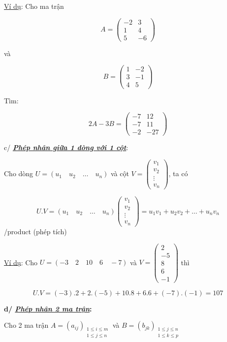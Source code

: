 \documentclass[12pt,a4paper]{article} \usepackage[utf8]{inputenc} \usepackage[T5]{fontenc} \usepackage[vietnamese]{babel} \usepackage{amsmath, amssymb, amsfonts} \usepackage{ulem}
\begin{document}
\ul{Ví dụ}: Cho ma trận

$$
A = \begin{pmatrix} -2 & 3 \\ 1 & 4 \\ 5 & -6 \end{pmatrix}
$$

và

$$
B = \begin{pmatrix} 1 & -2 \\ 3 & -1 \\ 4 & 5 \end{pmatrix}
$$

Tìm:

$$
2A - 3B = \begin{pmatrix} -7 & 12 \\ -7 & 11 \\ -2 & -27 \end{pmatrix}
$$

c/ \emph{\textbf{\ul{Phép nhân giữa 1 dòng với 1 cột}}}:

Cho dòng $U = (u_1 \quad u_2 \quad \ldots \quad u_n)$ và cột $V = \begin{pmatrix} v_1 \\ v_2 \\ \vdots \\ v_n \end{pmatrix}$, ta có

$$
U.V = (u_1 \quad u_2 \quad \ldots \quad u_n) \begin{pmatrix} v_1 \\ v_2 \\ \vdots \\ v_n \end{pmatrix} = u_1v_1 + u_2v_2 + \ldots + u_nv_n
$$ /product (phép
tích)

\ul{Ví dụ}: Cho $U = (-3 \quad 2 \quad 10 \quad 6 \quad -7)$
và $V = \begin{pmatrix} 2 \\ -5 \\ 8 \\ 6 \\ -1 \end{pmatrix}$ thì

$$
U.V = (-3).2 + 2.(-5) + 10.8 + 6.6 + (-7).(-1) = 107
$$

\textbf{d/ \emph{\ul{Phép nhân 2 ma trận}}:}

Cho 2 ma trận $A = (a_{ij})_{\substack{1 \le i \le m \\ 1 \le j \le n}}$ và $B = (b_{jk})_{\substack{1 \le j \le n \\ 1 \le k \le p}}$
\end{document}
